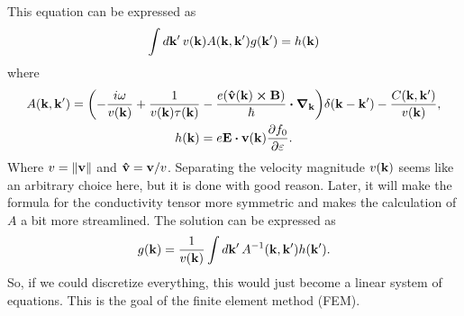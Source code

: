 \documentclass[12pt]{article}
\begin{document}
This equation can be expressed as
\begin{equation}
    \int \dd{\vb{k'}} v(\vb{k}) A(\vb{k}, \vb{k'}) g(\vb{k'}) = h(\vb{k})
    \label{eq:integral_equation}
\end{equation}
where
\begin{gather}
    A(\vb{k}, \vb{k'}) = \qty(-\frac{i\omega}{v(\vb{k})} + \frac{1}{v(\vb{k})\tau(\vb{k})}
        - \frac{e\qty(\vu{v}(\vb{k})\cross\vb{B})}{\hbar}\vdot\grad_{\vb{k}})\delta(\vb{k}-\vb{k'})
        - \frac{C(\vb{k},\vb{k'})}{v(\vb{k})}, \label{eq:operator} \\
    h(\vb{k}) = e\vb{E}\vdot\vb{v}(\vb{k})\pdv{f_0}{\varepsilon}.
\end{gather}
Where $v=\norm{\vb{v}}$ and $\vu{v}=\vb{v}/v$. Separating the velocity magnitude $v(\vb{k})$
seems like an arbitrary choice here, but it is done with good reason. Later, it will make the
formula for the conductivity tensor more symmetric and makes the calculation of $A$ a bit more
streamlined. The solution can be expressed as
\begin{equation}
    g(\vb{k}) = \frac{1}{v(\vb{k})} \int\dd{\vb{k'}} A^{-1}(\vb{k}, \vb{k'}) h(\vb{k'}).
\end{equation}
So, if we could discretize everything, this would just become a linear system of equations. This is
the goal of the finite element method (FEM).
\end{document}
